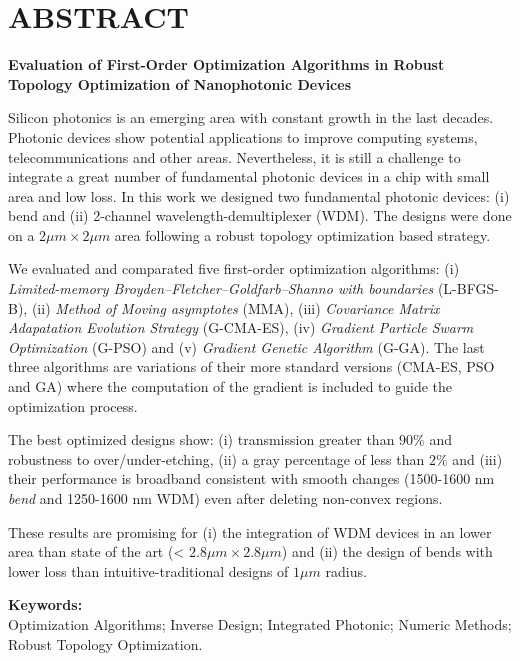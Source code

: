 \chapter*{\center \Large \vspace{-5.5cm} ABSTRACT}

\begin{center}
\Large \vspace{-1.5cm} \textbf{Evaluation of First-Order Optimization Algorithms in Robust Topology Optimization of Nanophotonic Devices}
\end{center}

Silicon photonics is an emerging area with constant growth in the last decades.
Photonic devices show potential applications to improve computing systems, telecommunications and other areas.
Nevertheless, it is still a challenge to integrate a great number of fundamental photonic
devices in a chip with small area and low loss.
In this work we designed two fundamental photonic devices: (i) bend and (ii)
2-channel wavelength-demultiplexer (WDM).
The designs were done on a $2 \mu m \times 2 \mu m$ area following a robust topology
optimization based strategy.

We evaluated and comparated five first-order optimization algorithms:
(i) \emph{Limited-memory Broyden–Fletcher–Goldfarb–Shanno with boundaries} (L-BFGS-B), 
(ii) \emph{Method of Moving asymptotes} (MMA), 
(iii) \emph{Covariance Matrix Adapatation Evolution Strategy} (G-CMA-ES), (iv) \emph{Gradient Particle Swarm
Optimization} (G-PSO) and (v) \emph{Gradient Genetic Algorithm} (G-GA). 
The last three algorithms are variations of their more standard versions (CMA-ES, PSO and GA)
where the computation of the gradient is included to guide the optimization process.

The best optimized designs show:
(i) transmission greater than $90 \%$ and robustness to over/under-etching,
(ii) a gray percentage of less than $2 \%$ and
(iii) their performance is broadband consistent with smooth changes 
(1500-1600 nm \emph{bend} and 1250-1600 nm WDM) even after deleting non-convex regions.

These results are promising for 
(i) the integration of WDM devices in an lower area than 
state of the art (< $2.8 \mu m \times 2.8 \mu m$) and 
(ii) the design of bends with lower loss than intuitive-traditional designs of $1 \mu m$ radius.

\noindent \textbf{Keywords:}\\
\noindent Optimization Algorithms; Inverse Design; Integrated Photonic; Numeric Methods; Robust Topology
Optimization.

